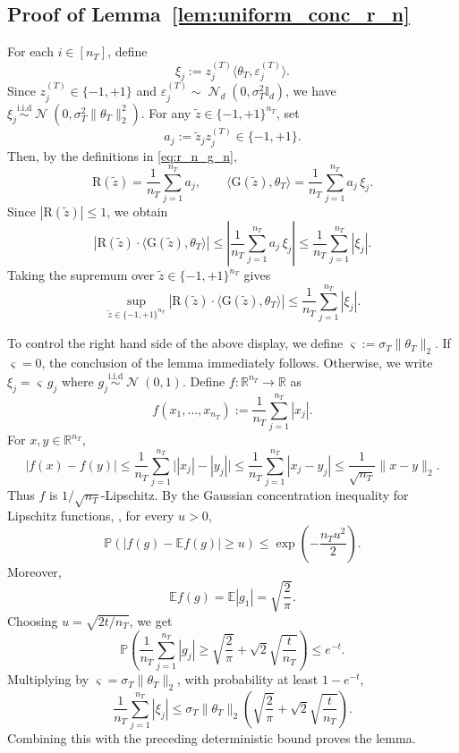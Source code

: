 \documentclass[10pt]{article}
\newcommand{\R}{\mathbb R}
\newcommand{\simiid}{\overset{\mathrm{i.i.d}}{\sim}}
\newcommand{\Id}{\mathbb I}
\newcommand{\wt}{\widetilde}
\DeclareMathOperator{\dnorm}{\mathcal N}
\newcommand{\trg}{T}
\newcommand{\thetaT}{\theta_{\trg}}
\newcommand{\nT}{n_{\trg}}
\newcommand{\sigmaT}{\sigma_{\trg}}
\newcommand{\ztar}{z^{(\trg)}}
\begin{document}
\subsection{Proof of Lemma~\ref{lem:uniform_conc_r_n}}
For each \(i\in[\nT]\), define
\[
\xi_j:=\ztar_j\langle \thetaT,\varepsilon^{(\trg)}_j\rangle .
\]
Since $\ztar_j\in\{-1,+1\}$ and $\varepsilon^{(\trg)}_j\sim \dnorm_d(0,\sigmaT^2 \Id_d)$, we have
\(
\xi_j\simiid \dnorm(0,\sigmaT^2\|\thetaT\|_2^2).
\)
For any $\wt z\in\{-1,+1\}^{\nT}$, set
\[
    a_j:=\wt z_j \ztar_j\in\{-1,+1\}.
\]
Then, by the definitions in \eqref{eq:r_n_g_n},
\[
\mathrm R(\wt z)=\frac{1}{\nT}\sum_{j =1}^{\nT}a_j,\qquad
\langle \mathrm G(\wt z),\thetaT\rangle=\frac{1}{\nT}\sum_{j =1}^{\nT}a_j\,\xi_j .
\]
Since $|\mathrm R(\wt z)|\le 1$, we obtain
\[
\left|\mathrm R(\wt z)\cdot\langle \mathrm G(\wt z),\thetaT\rangle\right|
\le \left|\frac1{\nT}\sum_{j =1}^{\nT}a_j\,\xi_j\right|
\le\frac1{\nT}\sum_{j =1}^{\nT}|\xi_j|.
\]
Taking the supremum over $\wt z\in\{-1,+1\}^{\nT}$ gives
\[
\sup_{\wt z\in\{-1,+1\}^{\nT}}\left|\mathrm R(\wt z)\cdot\langle \mathrm G(\wt z),\thetaT\rangle\right|\le\frac1{\nT}\sum_{j =1}^{\nT}|\xi_j|.
\]

To control the right hand side of the above display, we define $\varsigma:=\sigmaT\|\thetaT\|_2$. If $\varsigma=0$, the conclusion of the lemma immediately follows. Otherwise, we write $\xi_j=\varsigma\,g_j$ where $g_j \simiid \dnorm(0,1)$.
Define $f:\R^{\nT} \to \R$ as
\[
f(x_1,\ldots,x_{\nT}):=\frac1{\nT}\sum_{j=1}^{\nT}|x_j|.
\]
For \(x,y\in\mathbb R^{\nT}\),
\[
|f(x)-f(y)|\le\frac1{\nT}\sum_{j=1}^{\nT}\bigl||x_j|-|y_j|\bigr|\le
\frac1{\nT}\sum_{j=1}^{\nT}|x_j-y_j|\le\frac1{\sqrt{\nT}}\|x-y\|_2.
\]
Thus $f$ is $1/\sqrt{\nT}$-Lipschitz. By the Gaussian concentration inequality for Lipschitz functions, \cite[Theorem 2.26]{wainwright2019high}, for every $u>0$,
\[
\mathbb P\left(|f(g)-\mathbb Ef(g)|\ge u\right)
\le \exp\left(-\frac{\nT u^2}{2}\right).
\]
Moreover,
\[
\mathbb Ef(g)=\mathbb E|g_1|=\sqrt{\frac{2}{\pi}}.
\]
Choosing $u=\sqrt{2t/\nT}$, we get
\[
\mathbb P\left(\frac1{\nT}\sum_{j =1}^{\nT}|g_j|\ge
        \sqrt{\frac{2}{\pi}}+\sqrt{2}\sqrt{\frac{t}{\nT}}\right) \le e^{-t}.
\]
Multiplying by $\varsigma=\sigmaT\|\thetaT\|_2$, with probability at least \(1-e^{-t}\),
\[
\frac1{\nT}\sum_{j =1}^{\nT}|\xi_j|\le\sigmaT\|\thetaT\|_2\left(\sqrt{\frac{2}{\pi}}+\sqrt{2}\sqrt{\frac{t}{\nT}}\right).
\]
Combining this with the preceding deterministic bound proves the lemma.
\end{document}
